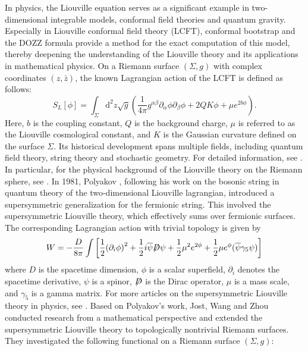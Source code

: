 \documentclass[a4paper, 12pt]{article}
\def\slashiii#1{\setbox0=\hbox{$#1$}#1\hskip-\wd0\hbox to\wd0{\hss\sl/\/\hss}}
\begin{document}
	In physics, the Liouville equation serves as a significant example in two-dimensional integrable models, conformal field theories and quantum gravity. Especially in Liouville conformal field theory (LCFT), conformal bootstrap and the DOZZ formula provide a method for the exact computation of this model, thereby deepening the understanding of the Liouville theory and its applications in mathematical physics. On a Riemann surface \((\Sigma,g)\) with complex coordinates \((z, \bar{z})\), the known Lagrangian action of the LCFT is defined as follows:
	\[
	S_{L}[\phi] = \int_{\Sigma} \mathrm{d}^{2}z \sqrt{g} \left( \frac{1}{4\pi} g^{\alpha\beta} \partial_{\alpha}\phi \partial_{\beta}\phi + 2QK  \phi + \mu e^{2b\phi} \right).
	\]	
	Here, \( b \) is the coupling constant, \( Q \) is the background charge, \(\mu\) is referred to as the Liouville cosmological constant, and \(K\) is the Gaussian curvature defined on the surface \(\Sigma\). Its historical development spans multiple fields, including quantum field theory, string theory and stochastic geometry. For detailed information, see \cite{alday2010liouville,MR757857,dorn1994two,MR4816634,MR1171758,MR4060417,MR623209,polyakov1987gauge,teschner2001liouville,MR1413469}. In particular, for the physical background of the Liouville theory on the Riemann sphere, see \cite{david2016liouville}. In 1981, Polyakov \cite{polyakov1981quantum}, following his work on the bosonic string in quantum theory of the two-dimensional Liouville lagrangian, introduced a supersymmetric generalization for the fermionic string. This involved the supersymmetric Liouville theory, which effectively sums over fermionic surfaces. The corresponding Lagrangian action with trivial topology is given by
	\[
	W =  - \frac{D}{{8\pi }}\int {\left[ {\frac{1}{2}{{({\partial _i}\phi)}^2} + \frac{1}{2}i\overline \psi  \slashiii{D}\psi  + \frac{1}{2}{\mu ^2}{e^{2\phi}} + \frac{1}{2}\mu {e^\phi}(\overline \psi  {\gamma _5}\psi )} \right]}
	\]
	where \( D \) is the spacetime dimension, \( \phi \) is a scalar superfield, \( \partial_i \) denotes the spacetime derivative, \( \psi \) is a spinor, $\slashiii{D}$ is the Dirac operator, \( \mu \) is a mass scale, and \( \gamma_5 \) is a gamma matrix. For more articles on the supersymmetric Liouville theory in physics, see \cite{MR1372587,MR1028444,fukuda2002super,MR1608487,strominger1998black}. Based on Polyakov's work, Jost, Wang and Zhou \cite{jost2007super} conducted research from a mathematical perspective and extended the supersymmetric Liouville theory to topologically nontrivial Riemann surfaces. They investigated the following functional on a Riemann surface $(\Sigma,g)$:
\end{document}
